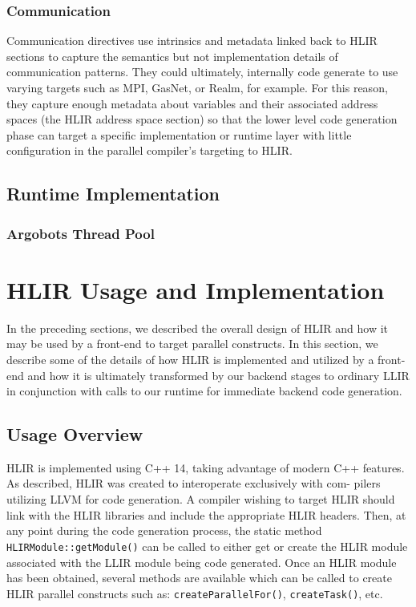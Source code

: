 \documentclass[12pt]{article}
\begin{document}
\subsubsection{Communication}

Communication directives use intrinsics and metadata linked back to HLIR sections to capture the semantics but not implementation details of communication patterns. They could ultimately, internally code generate to use varying targets such as MPI, GasNet, or Realm, for example. For this reason, they capture enough metadata about variables and their associated address spaces (the HLIR address space section) so that the lower level code generation phase can target a specific implementation or runtime layer with little configuration in the parallel compiler's targeting to HLIR.

\subsection{Runtime Implementation}

\subsubsection{Argobots Thread Pool}

\section{HLIR Usage and Implementation}

In the preceding sections, we described the overall design of HLIR and how it may be used by a front-end to target parallel constructs. In this section, we describe some of the details of how HLIR is implemented and utilized by a front-end and how it is ultimately transformed by our backend stages to ordinary LLIR in conjunction with calls to our runtime for immediate backend code generation.

\subsection{Usage Overview}

HLIR is implemented using C++ 14, taking advantage of modern C++ features. As described, HLIR was created to interoperate exclusively with com- pilers utilizing LLVM for code generation. A compiler wishing to target HLIR should link with the HLIR libraries and include the appropriate HLIR headers. Then, at any point during the code generation process, the static method {\tt HLIRModule::getModule()} can be called to either get or create the HLIR module associated with the LLIR module being code generated. Once an HLIR module has been obtained, several methods are available which can be called to create HLIR parallel constructs such as: {\tt createParallelFor()}, {\tt createTask()}, etc.
\end{document}
